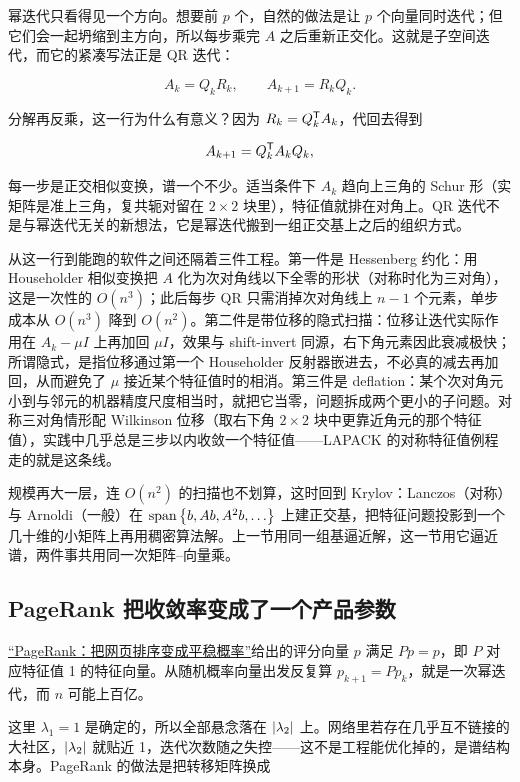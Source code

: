 幂迭代只看得见一个方向。想要前 \(p\) 个，自然的做法是让 \(p\) 个向量同时迭代；但它们会一起坍缩到主方向，所以每步乘完 \(A\) 之后重新正交化。这就是子空间迭代，而它的紧凑写法正是 QR 迭代：

\[
A_k=Q_kR_k,\qquad A_{k+1}=R_kQ_k.
\]

分解再反乘，这一行为什么有意义？因为 \(R_k=Q_k^{\mathsf{T}}A_k\)，代回去得到

\[
A_{k+1}=Q_k^{\mathsf{T}}A_kQ_k,
\]

每一步是正交相似变换，谱一个不少。适当条件下 \(A_k\) 趋向上三角的 Schur 形（实矩阵是准上三角，复共轭对留在 \(2\times2\) 块里），特征值就排在对角上。QR 迭代不是与幂迭代无关的新想法，它是幂迭代搬到一组正交基上之后的组织方式。

从这一行到能跑的软件之间还隔着三件工程。第一件是 Hessenberg 约化：用 Householder 相似变换把 \(A\) 化为次对角线以下全零的形状（对称时化为三对角），这是一次性的 \(O(n^3)\)；此后每步 QR 只需消掉次对角线上 \(n-1\) 个元素，单步成本从 \(O(n^3)\) 降到 \(O(n^2)\)。第二件是带位移的隐式扫描：位移让迭代实际作用在 \(A_k-\mu I\) 上再加回 \(\mu I\)，效果与 shift-invert 同源，右下角元素因此衰减极快；所谓隐式，是指位移通过第一个 Householder 反射器嵌进去，不必真的减去再加回，从而避免了 \(\mu\) 接近某个特征值时的相消。第三件是 deflation：某个次对角元小到与邻元的机器精度尺度相当时，就把它当零，问题拆成两个更小的子问题。对称三对角情形配 Wilkinson 位移（取右下角 \(2\times2\) 块中更靠近角元的那个特征值），实践中几乎总是三步以内收敛一个特征值——LAPACK 的对称特征值例程走的就是这条线。

规模再大一层，连 \(O(n^2)\) 的扫描也不划算，这时回到 Krylov：Lanczos（对称）与 Arnoldi（一般）在 \(\operatorname{span}\left\{b,Ab,A^2b,\ldots\right\}\) 上建正交基，把特征问题投影到一个几十维的小矩阵上再用稠密算法解。上一节用同一组基逼近解，这一节用它逼近谱，两件事共用同一次矩阵--向量乘。

\subsection{PageRank 把收敛率变成了一个产品参数}

\hyperref[sec:06-Random-Processes/04-Applications/03]{``PageRank：把网页排序变成平稳概率''}给出的评分向量 \(p\) 满足 \(Pp=p\)，即 \(P\) 对应特征值 1 的特征向量。从随机概率向量出发反复算 \(p_{k+1}=Pp_k\)，就是一次幂迭代，而 \(n\) 可能上百亿。

这里 \(\lambda_1=1\) 是确定的，所以全部悬念落在 \(\left|\lambda_2\right|\) 上。网络里若存在几乎互不链接的大社区，\(\left|\lambda_2\right|\) 就贴近 1，迭代次数随之失控——这不是工程能优化掉的，是谱结构本身。PageRank 的做法是把转移矩阵换成

